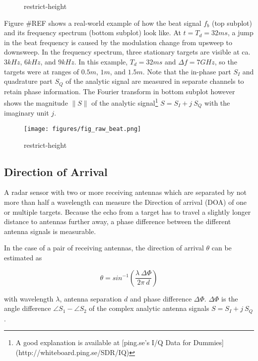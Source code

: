 \begin{figure}
\centering
%
\caption{restrict-height}
\end{figure}

Figure \#REF shows a real-world example of how the beat signal \(f_b\)
(top subplot) and its frequency spectrum (bottom subplot) look like. At
\(t=T_d=32ms\), a jump in the beat frequency is caused by the modulation
change from upsweep to downsweep. In the frequency spectrum, three
stationary targets are visible at ca. \(3kHz\), \(6kHz\), and \(9kHz\).
In this example, \(T_d=32ms\) and \(\Delta f=7GHz\), so the targets were
at ranges of \(0.5m\), \(1m\), and \(1.5m\). Note that the in-phase part
\(S_I\) and quadrature part \(S_Q\) of the analytic signal are measured
in separate channels to retain phase information. The Fourier transform
in bottom subplot however shows the magnitude \(\|S\|\) of the analytic
signal\footnote{A good explanation is available at [ping.se's I/Q Data for Dummies](http://whiteboard.ping.se/SDR/IQ)}
\(S = S_I + j~S_Q\) with the imaginary unit \(j\).

\begin{figure}
\centering
\texttt{[image: figures/fig\_raw\_beat.png]}
\caption{restrict-height}
\end{figure}

\subsection{Direction of Arrival}\label{direction-of-arrival}

A radar sensor with two or more receiving antennas which are separated
by not more than half a wavelength can measure the Direction of arrival
(DOA) of one or multiple targets. Because the echo from a target has to
travel a slightly longer distance to antennas further away, a phase
difference between the different antenna signals is measurable.

In the case of a pair of receiving antennas, the direction of arrival
\(\theta\) can be estimated \cite{VanZeijl2014} as

\[\theta = sin^{-1}\left({\frac{\lambda~\Delta\Phi}{2\pi ~d}}\right)\]

with wavelength \(\lambda\), antenna separation \(d\) and phase
difference \(\Delta\Phi\). \(\Delta\Phi\) is the angle difference
\(\angle S_1 - \angle S_2\) of the complex analytic antenna signals
\(S = S_I + j~S_Q\).

